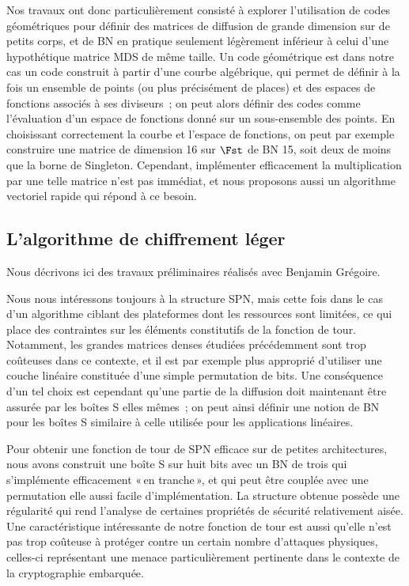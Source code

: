 Nos travaux ont donc particulièrement consisté à explorer l'utilisation de codes géométriques pour définir des matrices de diffusion
de grande dimension sur de petits corps, et de BN en pratique seulement légèrement inférieur à celui d'une hypothétique matrice MDS de même taille.
Un code géométrique est dans notre cas un code construit à partir d'une courbe algébrique, qui permet de définir à la fois un ensemble
de points (ou plus précisément de places) et des espaces de fonctions associés à ses diviseurs~; on peut alors définir des codes
comme l'évaluation d'un espace de fonctions donné sur un sous-ensemble des points.
En choisissant correctement la courbe et l'espace de fonctions, on peut par exemple construire une matrice de dimension 16 sur
$\Fst$ de BN 15, soit deux de moins que la borne de Singleton. Cependant, implémenter efficacement la multiplication par une telle
matrice n'est pas immédiat, et nous proposons aussi un algorithme vectoriel rapide qui répond à ce besoin.

\subsection{L'algorithme de chiffrement léger \fly \cite{fly}}

Nous décrivons ici des travaux préliminaires réalisés avec Benjamin Grégoire.

\medskip

Nous nous intéressons toujours à la structure SPN, mais cette fois dans le cas d'un algorithme ciblant des plateformes dont les ressources
sont limitées, ce qui place des contraintes sur les éléments constitutifs de la fonction de tour. Notamment, les grandes matrices
denses étudiées précédemment sont trop coûteuses dans ce contexte, et il est par exemple plus approprié d'utiliser une couche linéaire
constituée d'une simple permutation de bits. Une conséquence d'un tel choix est cependant qu'une partie de la diffusion doit maintenant
être assurée par les boîtes S elles mêmes~; on peut ainsi définir une notion de BN pour les boîtes S similaire à celle utilisée pour
les applications linéaires.

Pour obtenir une fonction de tour de SPN efficace sur de petites architectures, nous avons construit une boîte S sur huit bits avec
un BN de trois qui s'implémente efficacement «\,en tranche\,», et qui peut être couplée avec une permutation elle aussi facile
d'implémentation. La structure obtenue possède une régularité qui rend l'analyse de certaines propriétés de sécurité
relativement aisée. Une caractéristique intéressante de notre fonction de tour est aussi qu'elle n'est pas trop coûteuse à protéger
contre un certain nombre d'attaques physiques, celles-ci représentant une menace particulièrement pertinente dans le contexte
de la cryptographie embarquée.

